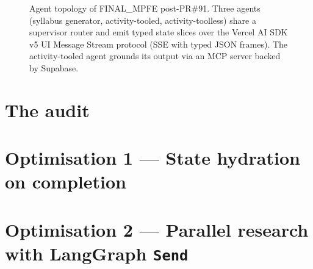 \begin{figure}[h]
  \centering
  \caption{Agent topology of FINAL\_MPFE post-PR\#91. Three agents
  (syllabus generator, activity-tooled, activity-toolless) share a
  supervisor router and emit typed state slices over the Vercel AI SDK
  v5 UI Message Stream protocol (SSE with typed JSON frames). The
  activity-tooled agent grounds its output via an MCP server backed by
  Supabase.}
  \label{fig:topology}
\end{figure}

\section{The audit}
\label{sec:audit}


\section{Optimisation 1 — State hydration on completion}
\label{sec:opt-hydration}

\section{Optimisation 2 — Parallel research with LangGraph \texttt{Send}}
\label{sec:opt-parallel}
%

